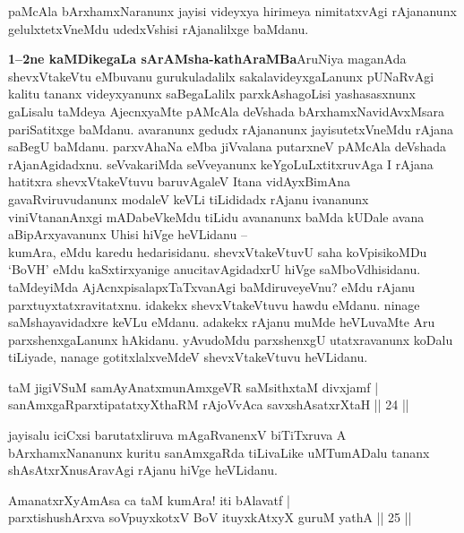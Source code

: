 \begin{artha}
paMcAla bArxhamxNaranunx jayisi videyxya hirimeya nimitatxvAgi 
rAjananunx gelulxtetxVneMdu udedxVshisi rAjanalilxge baMdanu.
\end{artha}

\begin{artha}
\textbf{1{\rm --}2ne kaMDikegaLa sArAMsha-kathAraMBa}\mdash AruNiya maganAda 
shevxVtakeVtu eMbuvanu gurukuladalilx sakalavideyxgaLanunx pUNaRvAgi 
kalitu tananx videyxyanunx saBegaLalilx parxkAshagoLisi yashasasxnunx 
gaLisalu taMdeya AjecnxyaMte pAMcAla deVshada bArxhamxNavidAvxMsara 
pariSatitxge baMdanu. avaranunx gedudx rAjananunx jayisutetxVneMdu 
rAjana saBegU baMdanu. parxvAhaNa eMba jiVvalana putarxneV pAMcAla 
deVshada rAjanAgidadxnu. seVvakariMda seVveyanunx keYgoLuLxtitxruvAga 
I rAjana hatitxra shevxVtakeVtuvu baruvAgaleV Itana vidAyxBimAna 
gavaRviruvudanunx modaleV keVLi tiLididadx rAjanu ivananunx 
viniVtananAnxgi mADabeVkeMdu tiLidu avananunx baMda kUDale avana 
aBipArxyavanunx Uhisi hiVge heVLidanu {\rm --}\\
kumAra, eMdu karedu hedarisidanu. shevxVtakeVtuvU saha koVpisikoMDu 
`BoVH' eMdu kaSxtirxyanige anucitavAgidadxrU hiVge saMboVdhisidanu. 
taMdeyiMda AjAcnxpisalapxTaTxvanAgi baMdiruveyeVnu? eMdu rAjanu 
parxtuyxtatxravitatxnu. idakekx shevxVtakeVtuvu hawdu eMdanu. ninage 
saMshayavidadxre keVLu eMdanu. adakekx rAjanu muMde heVLuvaMte Aru 
parxshenxgaLanunx hAkidanu. yAvudoMdu parxshenxgU utatxravanunx koDalu 
tiLiyade, nanage gotitxlalxveMdeV shevxVtakeVtuvu heVLidanu.
\end{artha}

\begin{shl}
taM jigiVSuM samAyAnatxmunAmxgeVR saMsithxtaM divxjamf | \\
sanAmxgaRparxtipatatxyXthaRM rAjoVvAca savxshAsatxrXtaH \hfill|| 24 || 
\end{shl}

\begin{artha}
jayisalu iciCxsi barutatxliruva mAgaRvanenxV biTiTxruva A 
bArxhamxNananunx kuritu sanAmxgaRda tiLivaLike uMTumADalu tananx 
shAsAtxrXnusAravAgi rAjanu hiVge heVLidanu.
\end{artha}

\begin{shl}
AmanatxrXyAmAsa ca taM kumAra! iti bAlavatf | \\
parxtishushArxva soV\s puyxkotxV BoV ituyxkAtxyX guruM yathA \hfill|| 25 || 
\end{shl}

